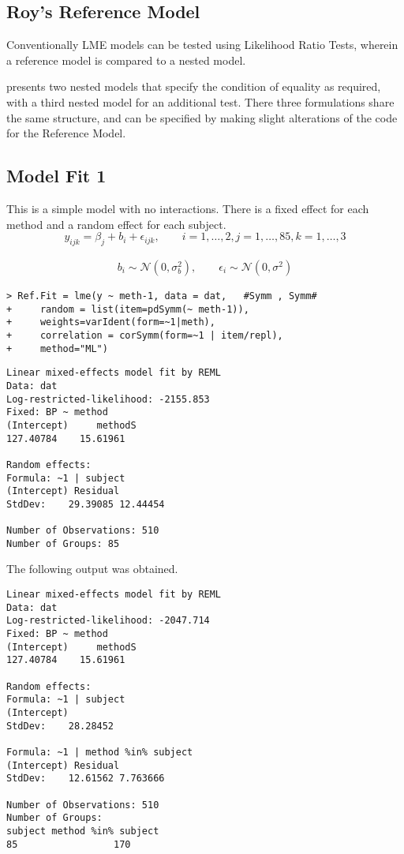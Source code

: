 \subsection{Roy's Reference Model}
Conventionally LME models can be tested using Likelihood Ratio Tests, wherein a reference model is compared to a nested model.


\citet{ARoy2009} presents two nested models that specify the condition of equality as required, with a third nested model for an additional test. There three formulations share the same structure, and can be specified by making slight alterations of the code for the Reference Model.

\subsection{Model Fit 1}

This is a simple model with no interactions. There is a fixed effect for each method and a random effect for each subject.
\begin{equation*}
y_{ijk} = \beta_{j}  + b_{i} + \epsilon_{ijk}, \qquad i=1,\dots,2, j=1,\dots,85, k=1,\dots,3
\end{equation*}

\begin{eqnarray*}
b_{i} \sim \mathcal{N}(0,\sigma^2_{b}), \qquad \epsilon_{i} \sim \mathcal{N}(0,\sigma^2)
\end{eqnarray*}
\begin{framed}
\begin{verbatim}
> Ref.Fit = lme(y ~ meth-1, data = dat,   #Symm , Symm#
+     random = list(item=pdSymm(~ meth-1)), 
+     weights=varIdent(form=~1|meth),
+     correlation = corSymm(form=~1 | item/repl), 
+     method="ML")
\end{verbatim}
\end{framed}

\begin{verbatim}
Linear mixed-effects model fit by REML
Data: dat
Log-restricted-likelihood: -2155.853
Fixed: BP ~ method
(Intercept)     methodS
127.40784    15.61961

Random effects:
Formula: ~1 | subject
(Intercept) Residual
StdDev:    29.39085 12.44454

Number of Observations: 510
Number of Groups: 85
\end{verbatim}

The following output was obtained.

\begin{verbatim}
Linear mixed-effects model fit by REML
Data: dat
Log-restricted-likelihood: -2047.714
Fixed: BP ~ method
(Intercept)     methodS
127.40784    15.61961

Random effects:
Formula: ~1 | subject
(Intercept)
StdDev:    28.28452

Formula: ~1 | method %in% subject
(Intercept) Residual
StdDev:    12.61562 7.763666

Number of Observations: 510
Number of Groups:
subject method %in% subject
85                 170
\end{verbatim}

